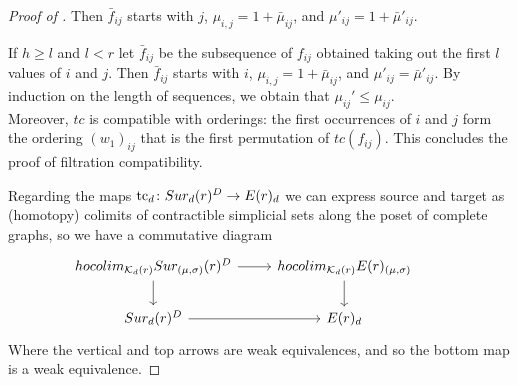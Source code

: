 \begin{proof}[Proof of ]
	Then $\bar{f}_{ij}$
	starts with $j$,
	$\mu_{i,j}=1+\bar{\mu}_{ij}$,
	and $\mu'_{ij}=1+\bar{\mu}'_{ij}$.

	If $h \geq l$ and $l<r$
	let $\bar{f}_{ij}$ be the subsequence of $f_{ij}$ obtained taking out the first $l$ values of $i$ and $j$.
	Then $\bar{f}_{ij}$
	starts with $i$,
	$\mu_{i,j}=1+\bar{\mu}_{ij}$,
	and $\mu'_{ij}=\bar{\mu}'_{ij}$.
	By induction on the length of sequences, we obtain that
	$\mu_{ij}'\le \mu_{ij}$.\\
	Moreover, $tc$ is compatible with orderings: the first occurrences of $i$ and $j$ form the ordering $(w_1)_{ij}$ that is the first permutation of $tc(f_{ij})$.
	This concludes the proof of filtration compatibility.

Regarding the maps $\operatorname{tc}_{d} \colon Sur_{d}(r)^{D}\rightarrow E(r)_{d}$ we can express source and target as (homotopy) colimits of contractible %
	simplicial sets along the poset of complete graphs,
	so we have a commutative diagram
	\begin{equation*}
		\begin{tikzcd}			hocolim_{\CG_d(r)}\sur_{(\mu,\sigma)}(r)^{D} \arrow[r] \arrow[d]& hocolim_{\CG_d(r)}\BE(r)_{(\mu,\sigma)} \arrow[d] \\
			\sur_{d}(r)^{D}\arrow[r] & \BE(r)_{d}&
		\end{tikzcd}
	\end{equation*}
	Where the vertical and top arrows
	are weak equivalences, and so the bottom map is a weak equivalence.
\end{proof}